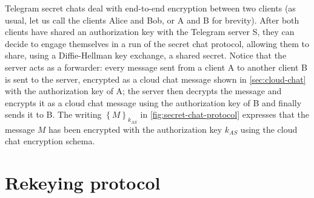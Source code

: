 Telegram secret chats deal with end-to-end encryption between two clients (as usual, let us call the clients Alice and Bob, or A and B for brevity). After both clients have shared an authorization key with the Telegram server S, they can decide to engage themselves in a run of the secret chat protocol, allowing them to share, using a Diffie-Hellman key exchange, a shared secret. Notice that the server acts as a forwarder: every message sent from a client A to another client B is sent to the server, encrypted as a cloud chat message shown in \cref{sec:cloud-chat} with the authorization key of A; the server then decrypts the message and encrypts it as a cloud chat message using the authorization key of B and finally sends it to B. The writing $\left\{M\right\}_{k_{AS}}$ in \cref{fig:secret-chat-protocol} expresses that the message $M$ has been encrypted with the authorization key $k_{AS}$ using the cloud chat encryption schema.




\section{Rekeying protocol}
\label{sec:rekeying}